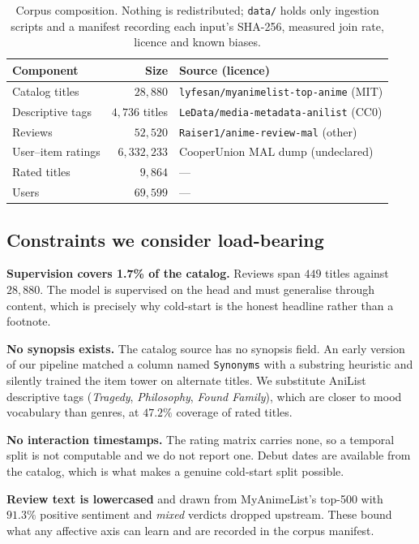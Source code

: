 \documentclass[11pt,a4paper]{article}
\begin{document}
\begin{table}[h]
\centering
\caption{Corpus composition. Nothing is redistributed; \texttt{data/} holds only
ingestion scripts and a manifest recording each input's SHA-256, measured join
rate, licence and known biases.}
\begin{tabular}{lrl}
\toprule
Component & Size & Source (licence) \\
\midrule
Catalog titles        & $28{,}880$    & \texttt{lyfesan/myanimelist-top-anime} (MIT) \\
Descriptive tags      & $4{,}736$ titles & \texttt{LeData/media-metadata-anilist} (CC0) \\
Reviews               & $52{,}520$    & \texttt{Raiser1/anime-review-mal} (other) \\
User--item ratings    & $6{,}332{,}233$ & CooperUnion MAL dump (undeclared) \\
Rated titles          & $9{,}864$     & --- \\
Users                 & $69{,}599$    & --- \\
\bottomrule
\end{tabular}
\end{table}

\subsection{Constraints we consider load-bearing}

\textbf{Supervision covers 1.7\% of the catalog.} Reviews span $449$ titles
against $28{,}880$. The model is supervised on the head and must generalise
through content, which is precisely why cold-start is the honest headline rather
than a footnote.

\textbf{No synopsis exists.} The catalog source has no synopsis field. An early
version of our pipeline matched a column named \texttt{Synonyms} with a
substring heuristic and silently trained the item tower on alternate titles. We
substitute AniList descriptive tags (\emph{Tragedy}, \emph{Philosophy},
\emph{Found Family}), which are closer to mood vocabulary than genres, at
$47.2\%$ coverage of rated titles.

\textbf{No interaction timestamps.} The rating matrix carries none, so a
temporal split is not computable and we do not report one. Debut dates are
available from the catalog, which is what makes a genuine cold-start split
possible.

\textbf{Review text is lowercased} and drawn from MyAnimeList's top-500 with
$91.3\%$ positive sentiment and \emph{mixed} verdicts dropped upstream. These
bound what any affective axis can learn and are recorded in the corpus manifest.
\end{document}
